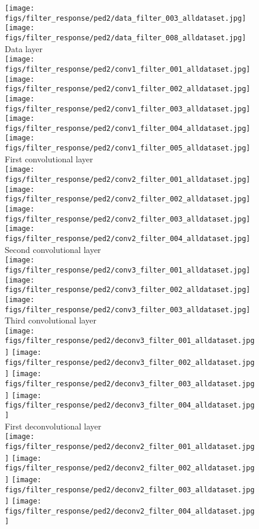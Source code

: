 \documentclass[10pt,twocolumn,letterpaper]{article}
\begin{document}
\begin{figure}[h]
	\centering
	\texttt{[image: figs/filter\_response/ped2/data\_filter\_003\_alldataset.jpg]}
	\texttt{[image: figs/filter\_response/ped2/data\_filter\_008\_alldataset.jpg]}\\
	{\footnotesize Data layer}\\
	\texttt{[image: figs/filter\_response/ped2/conv1\_filter\_001\_alldataset.jpg]}
	\texttt{[image: figs/filter\_response/ped2/conv1\_filter\_002\_alldataset.jpg]}
	\texttt{[image: figs/filter\_response/ped2/conv1\_filter\_003\_alldataset.jpg]}
	\texttt{[image: figs/filter\_response/ped2/conv1\_filter\_004\_alldataset.jpg]}
	\texttt{[image: figs/filter\_response/ped2/conv1\_filter\_005\_alldataset.jpg]}\\
	{\footnotesize First convolutional layer}\\
	\texttt{[image: figs/filter\_response/ped2/conv2\_filter\_001\_alldataset.jpg]}
	\texttt{[image: figs/filter\_response/ped2/conv2\_filter\_002\_alldataset.jpg]}
	\texttt{[image: figs/filter\_response/ped2/conv2\_filter\_003\_alldataset.jpg]}
	\texttt{[image: figs/filter\_response/ped2/conv2\_filter\_004\_alldataset.jpg]}\\
	{\footnotesize Second convolutional layer}\\
	\texttt{[image: figs/filter\_response/ped2/conv3\_filter\_001\_alldataset.jpg]}
	\texttt{[image: figs/filter\_response/ped2/conv3\_filter\_002\_alldataset.jpg]}
	\texttt{[image: figs/filter\_response/ped2/conv3\_filter\_003\_alldataset.jpg]}\\
	{\footnotesize Third convolutional layer}\\
	\texttt{[image: figs/filter\_response/ped2/deconv3\_filter\_001\_alldataset.jpg]}
	\texttt{[image: figs/filter\_response/ped2/deconv3\_filter\_002\_alldataset.jpg]}
	\texttt{[image: figs/filter\_response/ped2/deconv3\_filter\_003\_alldataset.jpg]}
	\texttt{[image: figs/filter\_response/ped2/deconv3\_filter\_004\_alldataset.jpg]}\\
	{\footnotesize First deconvolutional layer}\\
	\texttt{[image: figs/filter\_response/ped2/deconv2\_filter\_001\_alldataset.jpg]}
	\texttt{[image: figs/filter\_response/ped2/deconv2\_filter\_002\_alldataset.jpg]}
	\texttt{[image: figs/filter\_response/ped2/deconv2\_filter\_003\_alldataset.jpg]}
	\texttt{[image: figs/filter\_response/ped2/deconv2\_filter\_004\_alldataset.jpg]}

\end{figure}
\end{document}
